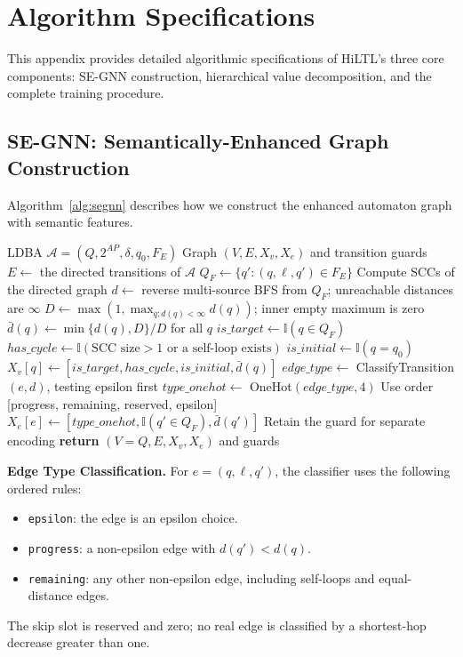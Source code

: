 \documentclass[journal]{IEEEtran}
\begin{document}
\appendices

\section{Algorithm Specifications}
\label{app:algorithms}

This appendix provides detailed algorithmic specifications of HiLTL's three core components: SE-GNN construction, hierarchical value decomposition, and the complete training procedure.

\subsection{SE-GNN: Semantically-Enhanced Graph Construction}

Algorithm~\ref{alg:segnn} describes how we construct the enhanced automaton graph with semantic features.

\begin{algorithm}[h]
\caption{SE-GNN Graph Construction}
\label{alg:segnn}
\begin{algorithmic}[1]
\REQUIRE LDBA $\mathcal A=(Q,2^{AP},\delta,q_0,F_E)$
\ENSURE Graph $(V,E,X_v,X_e)$ and transition guards
\STATE $E\gets$ the directed transitions of $\mathcal A$
\STATE $Q_F\gets\{q':(q,\ell,q')\in F_E\}$
\STATE Compute SCCs of the directed graph
\STATE $d\gets$ reverse multi-source BFS from $Q_F$; unreachable distances are $\infty$
\STATE $D\gets\max(1,\max_{q:d(q)<\infty}d(q))$; inner empty maximum is zero
\STATE $\bar d(q)\gets\min\{d(q),D\}/D$ for all $q$
 \STATE $is\_target\gets\mathbb I(q\in Q_F)$
 \STATE $has\_cycle\gets\mathbb I(\text{SCC size}>1\text{ or a self-loop exists})$
 \STATE $is\_initial\gets\mathbb I(q=q_0)$
 \STATE $X_v[q]\gets[is\_target,has\_cycle,is\_initial,\bar d(q)]$
\ENDFOR
{}
 \STATE $edge\_type\gets$ ClassifyTransition$(e,d)$, testing epsilon first
 \STATE $type\_onehot\gets$ OneHot$(edge\_type,4)$
\STATE Use order [progress, remaining, reserved, epsilon]
 \STATE $X_e[e]\gets[type\_onehot,\mathbb I(q'\in Q_F),\bar d(q')]$
 \STATE Retain the guard for separate encoding
\ENDFOR
\STATE \textbf{return} $(V=Q,E,X_v,X_e)$ and guards
\end{algorithmic}
\end{algorithm}

\textbf{Edge Type Classification.} For $e=(q,\ell,q')$, the classifier uses the following ordered rules:
\begin{itemize}
\item \texttt{epsilon}: the edge is an epsilon choice.
\item \texttt{progress}: a non-epsilon edge with $d(q')<d(q)$.
\item \texttt{remaining}: any other non-epsilon edge, including self-loops and equal-distance edges.
\end{itemize}
The skip slot is reserved and zero; no real edge is classified by a shortest-hop decrease greater than one.
\end{document}
